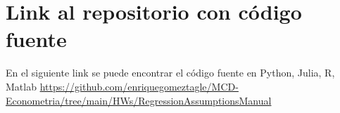 \documentclass[10pt]{article}
\begin{document}
\section{Link al repositorio con código fuente}
    En el siguiente link se puede encontrar el código fuente en Python, Julia, R, Matlab
    \url{https://github.com/enriquegomeztagle/MCD-Econometria/tree/main/HWs/RegressionAssumptionsManual}
\end{document}
